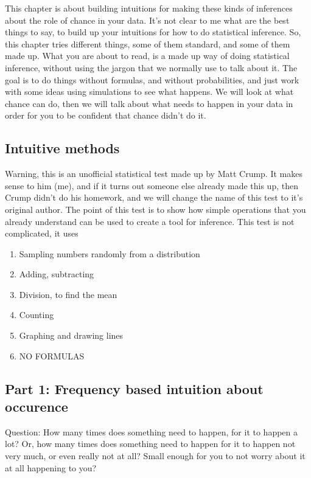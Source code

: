 \documentclass[
]{book}
\providecommand{\tightlist}{%
  \setlength{\itemsep}{0pt}\setlength{\parskip}{0pt}}
\begin{document}
This chapter is about building intuitions for making these kinds of inferences about the role of chance in your data. It's not clear to me what are the best things to say, to build up your intuitions for how to do statistical inference. So, this chapter tries different things, some of them standard, and some of them made up. What you are about to read, is a made up way of doing statistical inference, without using the jargon that we normally use to talk about it. The goal is to do things without formulas, and without probabilities, and just work with some ideas using simulations to see what happens. We will look at what chance can do, then we will talk about what needs to happen in your data in order for you to be confident that chance didn't do it.

\hypertarget{intuitive-methods}{%
\subsection{Intuitive methods}\label{intuitive-methods}}

Warning, this is an unofficial statistical test made up by Matt Crump. It makes sense to him (me), and if it turns out someone else already made this up, then Crump didn't do his homework, and we will change the name of this test to it's original author. The point of this test is to show how simple operations that you already understand can be used to create a tool for inference. This test is not complicated, it uses

\begin{enumerate}
\def\labelenumi{\arabic{enumi}.}
\tightlist
\item
  Sampling numbers randomly from a distribution
\item
  Adding, subtracting
\item
  Division, to find the mean
\item
  Counting
\item
  Graphing and drawing lines
\item
  NO FORMULAS
\end{enumerate}

\hypertarget{part-1-frequency-based-intuition-about-occurence}{%
\subsection{Part 1: Frequency based intuition about occurence}\label{part-1-frequency-based-intuition-about-occurence}}

Question: How many times does something need to happen, for it to happen a lot? Or, how many times does something need to happen for it to happen not very much, or even really not at all? Small enough for you to not worry about it at all happening to you?
\end{document}
